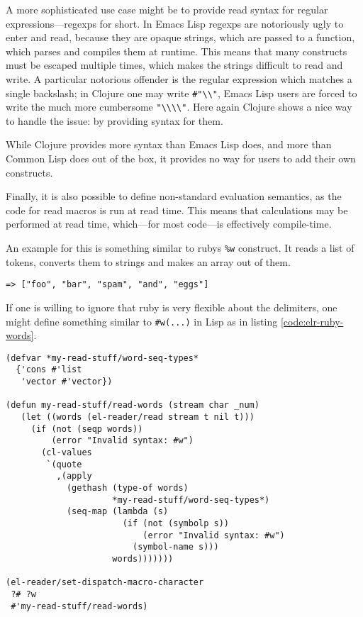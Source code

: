 \documentclass[a4paper,10pt,twoside]{article}
\newcommand{\el}{Emacs Lisp}
\newcommand{\cl}{Common Lisp}
\begin{document}
A more sophisticated use case might be to provide read syntax for regular
expressions---regexps for short.  In \el{} regexps are notoriously ugly to enter
and read, because they are opaque strings, which are passed to a function, which
parses and compiles them at runtime.  This means that many constructs must be
escaped multiple times, which makes the strings difficult to read and write.  A
particular notorious offender is the regular expression which matches a single
backslash; in Clojure one may write \texttt{\#"\textbackslash\textbackslash"},
\el{} users are forced to write the much more cumbersome
\texttt{"\textbackslash\textbackslash\textbackslash\textbackslash"}.  Here again
Clojure shows a nice way to handle the issue: by providing syntax for them.

While Clojure provides more syntax than \el{} does, and more than \cl{} does out
of the box, it provides no way for users to add their own constructs.

Finally, it is also possible to define non-standard evaluation semantics, as the
code for read macros is run at read time.  This means that calculations may be
performed at read time, which---for most code---is effectively compile-time.

An example for this is something similar to rubys \texttt{\%w} construct.  It
reads a list of tokens, converts them to strings and makes an array out of
them.  

\begin{lstlisting}[style=rubyinline]
%w(foo bar spam and eggs) 
=> ["foo", "bar", "spam", "and", "eggs"]
\end{lstlisting}

If one is willing to ignore that ruby is very flexible about the delimiters, one
might define something similar to \texttt{\#w(...)} in Lisp as in listing
\ref{code:elr-ruby-words}.

\begin{lstlisting}[style=lispcode,caption={A read macro for rubys word
  syntax.}, label={code:elr-ruby-words}]
(defvar *my-read-stuff/word-seq-types*
  {'cons #'list 
   'vector #'vector})

(defun my-read-stuff/read-words (stream char _num)
   (let ((words (el-reader/read stream t nil t)))
     (if (not (seqp words))
         (error "Invalid syntax: #w")
       (cl-values
        `(quote
          ,(apply
            (gethash (type-of words)
                     *my-read-stuff/word-seq-types*)
            (seq-map (lambda (s)
                       (if (not (symbolp s))
                           (error "Invalid syntax: #w")
                         (symbol-name s)))
                     words)))))))

(el-reader/set-dispatch-macro-character
 ?# ?w
 #'my-read-stuff/read-words)
\end{lstlisting}
\end{document}
